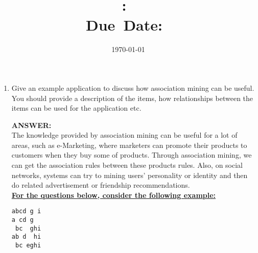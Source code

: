 \documentclass{article}
\title{\textbf{\hmwkClass:\ 
      \hmwkTitle}\\\normalsize\small{Due\ Date:\
    \hmwkDueDate}}
\date{\today}
\author{\textbf{\hmwkAuthorName}}
\begin{document}
\maketitle

\begin{enumerate}
\item Give an example application to discuss how association mining
  can be useful. You should provide a description of the items, how
  relationships between the items can be used for the application
  etc. 

\textbf{ANSWER:}\\
The knowledge provided by association mining can be useful for a lot
of areas, such as e-Marketing, where marketers can promote their
products to customers when they buy some of products. Through
association mining, we can get the association rules between these
products rules. Also, on social networks, systems can try to mining
users' personality or identity and then do related advertisement or
friendship recommendations. \\

\textbf{\underline{For the questions below, consider the following
    example: }} 
\begin{verbatim}
abcd g i
a cd g
 bc  ghi
ab d  hi
 bc eghi
\end{verbatim}


\end{enumerate}
\end{document}
